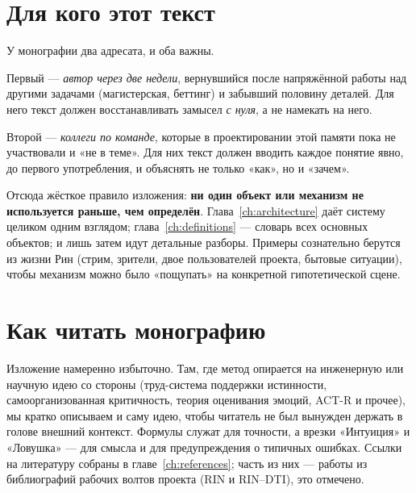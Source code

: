 \section{Для кого этот текст}

У монографии два адресата, и оба важны.

Первый — \emph{автор через две недели}, вернувшийся после напряжённой работы над
другими задачами (магистерская, беттинг) и забывший половину деталей. Для него
текст должен восстанавливать замысел \emph{с нуля}, а не намекать на него.

Второй — \emph{коллеги по команде}, которые в проектировании этой памяти пока не
участвовали и «не в теме». Для них текст должен вводить каждое понятие явно, до
первого употребления, и объяснять не только «как», но и «зачем».

Отсюда жёсткое правило изложения: \textbf{ни один объект или механизм не
используется раньше, чем определён}. Глава~\ref{ch:architecture} даёт систему
целиком одним взглядом; глава~\ref{ch:definitions} — словарь всех основных
объектов; и лишь затем идут детальные разборы. Примеры сознательно берутся из
жизни Рин (стрим, зрители, двое пользователей проекта, бытовые ситуации), чтобы
механизм можно было «пощупать» на конкретной гипотетической сцене.

\section{Как читать монографию}

Изложение намеренно избыточно. Там, где метод опирается на инженерную или
научную идею со стороны (труд-система поддержки истинности, самоорганизованная
критичность, теория оценивания эмоций, ACT-R и прочее), мы кратко описываем и
саму идею, чтобы читатель не был вынужден держать в голове внешний контекст.
Формулы служат для точности, а врезки «Интуиция» и «Ловушка» — для смысла и для
предупреждения о типичных ошибках. Ссылки на литературу собраны в
главе~\ref{ch:references}; часть из них — работы из библиографий рабочих волтов
проекта (RIN и RIN–DTI), это отмечено.
